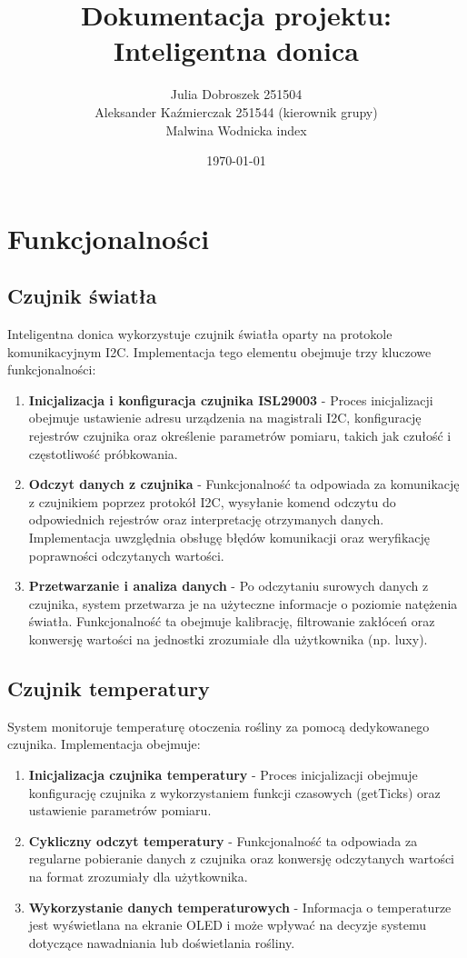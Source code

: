 \documentclass{article}
\title{Dokumentacja projektu: Inteligentna donica}
\author{
  Julia Dobroszek 251504 \\
  Aleksander Kaźmierczak 251544 (kierownik grupy)\\
  Malwina Wodnicka index \\
  
}
\date{\today}
\begin{document}
\maketitle

\section{Funkcjonalności}

\subsection{Czujnik światła}
Inteligentna donica wykorzystuje czujnik światła oparty na protokole komunikacyjnym I2C. Implementacja tego elementu obejmuje trzy kluczowe funkcjonalności:

\begin{enumerate}
    \item \textbf{Inicjalizacja i konfiguracja czujnika ISL29003} - Proces inicjalizacji obejmuje ustawienie adresu urządzenia na magistrali I2C, konfigurację rejestrów czujnika oraz określenie parametrów pomiaru, takich jak czułość i częstotliwość próbkowania.

    \item \textbf{Odczyt danych z czujnika} - Funkcjonalność ta odpowiada za komunikację z czujnikiem poprzez protokół I2C, wysyłanie komend odczytu do odpowiednich rejestrów oraz interpretację otrzymanych danych. Implementacja uwzględnia obsługę błędów komunikacji oraz weryfikację poprawności odczytanych wartości.

    \item \textbf{Przetwarzanie i analiza danych} - Po odczytaniu surowych danych z czujnika, system przetwarza je na użyteczne informacje o poziomie natężenia światła. Funkcjonalność ta obejmuje kalibrację, filtrowanie zakłóceń oraz konwersję wartości na jednostki zrozumiałe dla użytkownika (np. luxy).
\end{enumerate}

\subsection{Czujnik temperatury}
System monitoruje temperaturę otoczenia rośliny za pomocą dedykowanego czujnika. Implementacja obejmuje:

\begin{enumerate}
    \item \textbf{Inicjalizacja czujnika temperatury} - Proces inicjalizacji obejmuje konfigurację czujnika z wykorzystaniem funkcji czasowych (getTicks) oraz ustawienie parametrów pomiaru.
    
    \item \textbf{Cykliczny odczyt temperatury} - Funkcjonalność ta odpowiada za regularne pobieranie danych z czujnika oraz konwersję odczytanych wartości na format zrozumiały dla użytkownika.
    
    \item \textbf{Wykorzystanie danych temperaturowych} - Informacja o temperaturze jest wyświetlana na ekranie OLED i może wpływać na decyzje systemu dotyczące nawadniania lub doświetlania rośliny.
\end{enumerate}
\end{document}
